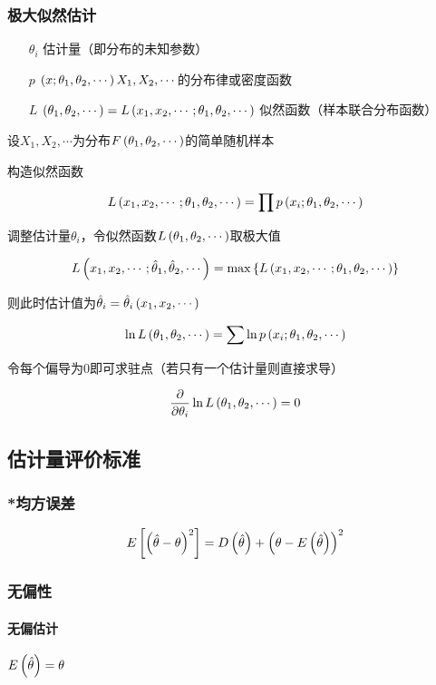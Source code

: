 \documentclass{article}
\begin{document}
\subsubsection{极大似然估计}

\begin{enumerate}
    \item [$\theta_i$] 估计量（即分布的未知参数）
    \item [$p$] $\left(x;\theta_1,\theta_2,\cdots\right)X_1,X_2,\cdots$的分布律或密度函数
    \item [$L$] $\left(\theta_1,\theta_2,\cdots\right)=L\left(x_1,x_2,\cdots;\theta_1,\theta_2,\cdots\right)$ 似然函数（样本联合分布函数）
\end{enumerate}

设$X_1,X_2,\cdots$为分布$F\left(\theta_1,\theta_2,\cdots\right)$的简单随机样本

构造似然函数

\[L\left(x_1,x_2,\cdots;\theta_1,\theta_2,\cdots\right)=\prod p\left(x_i;\theta_1,\theta_2,\cdots\right)\]

调整估计量$\theta_i$，令似然函数$L\left(\theta_1,\theta_2,\cdots\right)$取极大值

\[L\left(x_1,x_2,\cdots;\hat\theta_1,\hat\theta_2,\cdots\right)=\max\left\{L\left(x_1,x_2,\cdots;\theta_1,\theta_2,\cdots\right)\right\}\]

则此时估计值为$\hat\theta_i=\hat\theta_i\left(x_1,x_2,\cdots\right)$

\[\ln L\left(\theta_1,\theta_2,\cdots\right)=\sum\ln p\left(x_i;\theta_1,\theta_2,\cdots\right)\]

令每个偏导为$0$即可求驻点（若只有一个估计量则直接求导）

\[\frac\partial{\partial\theta_i}\ln L\left(\theta_1,\theta_2,\cdots\right)=0\]

\subsection{估计量评价标准}

\subsubsection{*均方误差}

\[E\left[\left(\hat\theta-\theta\right)^2\right]=D\left(\hat\theta\right)+{\left(\theta-E\left(\hat\theta\right)\right)}^2\]

\subsubsection{无偏性}

\paragraph{无偏估计}$E\left(\hat\theta\right)=\theta$
\end{document}
